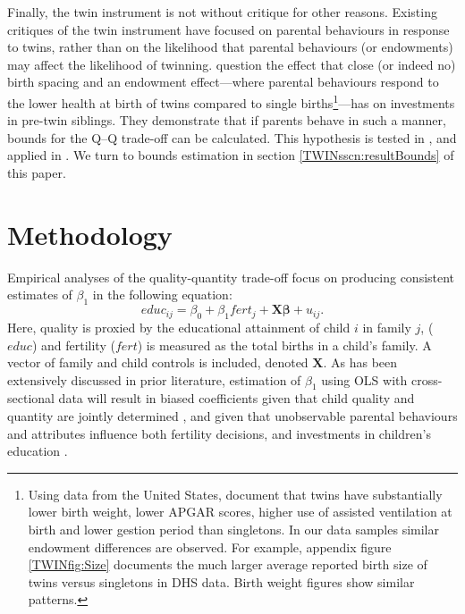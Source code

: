 Finally, the twin instrument is not without critique for other reasons. Existing
critiques of the twin instrument have focused on parental behaviours in response 
to twins, rather than on the likelihood that parental behaviours (or endowments) 
may affect the likelihood of twinning. \citet{RosenzweigZhang2009} question the 
effect that close (or indeed no) birth spacing and an endowment effect---where 
parental behaviours respond to the lower health at birth of twins compared to 
single births\footnote{Using data from the United States, \citet{Almondetal2005} 
document that twins have substantially lower birth weight, lower APGAR scores, 
higher use of assisted ventilation at birth and lower gestion period than 
singletons. In our data samples similar endowment differences are observed. For
example, appendix figure \ref{TWINfig:Size} documents the much larger average 
reported birth size of twins versus singletons in DHS data. Birth weight figures 
show similar patterns.}---has on investments in pre-twin siblings. They 
demonstrate that if parents behave in such a manner, bounds for the Q--Q 
trade-off can be calculated. This hypothesis is tested in 
\citet{Angristetal2010}, and applied in \citet{FitzsimonsMalde2014}.  We turn
to bounds estimation in section \ref{TWINsscn:resultBounds} of this paper.

\section{Methodology}                              \label{TWINscn:method}
Empirical analyses of the quality-quantity trade-off focus on producing 
consistent estimates of $\beta_1$ in the following equation:
\begin{equation}
\label{TWINeqn:RF}
educ_{ij}=\beta_0+\beta_1 fert_{j} + \bm{X}\bm{\beta}+u_{ij}.
\end{equation}
Here, quality is proxied by the educational attainment of child $i$ in family 
$j$, ($educ$) and fertility ($fert$) is measured as the total births in a child's
family.  A vector of family and child controls is included, denoted $\bm{X}$.  As
has been extensively discussed in prior literature, estimation of $\beta_1$ using
OLS with cross-sectional data will result in biased coefficients given that child 
quality and quantity are jointly determined \citep{BeckerLewis1973,
BeckerTomes1976}, and given that unobservable parental behaviours and attributes 
influence both fertility decisions, and investments in children's education 
\citep{Qian2009}.

